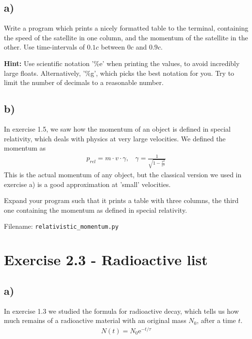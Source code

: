 \documentclass[10pt,a4paper]{article}
\renewcommand{\exp}{\mathrm{e}^}
\begin{document}
\subsection*{a)}
Write a program which prints a nicely formatted table to the terminal, containing the speed of the satellite in one column, and the momentum of the satellite in the other. Use time-intervals of $0.1c$ between $0c$ and $0.9c$.

\textbf{Hint:} Use scientific notation '\%e' when printing the values, to avoid incredibly large floats. Alternatively, '\%g', which picks the best notation for you. Try to limit the number of decimals to a reasonable number.


\subsection*{b)}

In exercise 1.5, we saw how the momentum of an object is defined in special relativity, which deals with physics at very large velocities. We defined the momentum as
\begin{align*}
p_{rel} = m\cdot v\cdot \gamma, \ \ \ \ \gamma = \frac{1}{\sqrt{1-\frac{v^2}{c^2}}}
\end{align*}
This is the actual momentum of any object, but the classical version we used in exercise a) is a good approximation at 'small' velocities.

Expand your program such that it prints a table with three columns, the third one containing the momentum as defined in special relativity.

Filename: \texttt{relativistic\_momentum.py}




\section*{Exercise 2.3 - Radioactive list}

\subsection*{a)}
In exercise 1.3 we studied the formula for radioactive decay, which tells us how much remains of a radioactive material with an original mass $N_0$, after a time $t$.
\begin{align*}
N(t) = N_0\exp{-t/\tau}
\end{align*}
\end{document}
